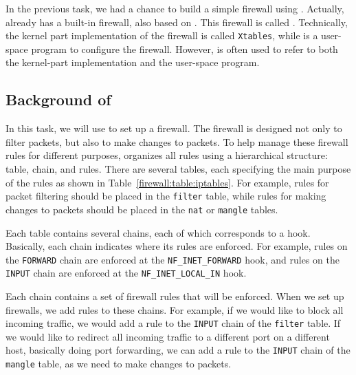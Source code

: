 In the previous task, we had a chance to build a simple firewall using \netfilter. Actually,
\linux already has a built-in firewall, also based on \netfilter. This firewall is called
\iptables. Technically, the kernel part implementation of the firewall
is called \texttt{Xtables}, while \iptables is a user-space program to
configure the firewall. However, \iptables is often used to refer to both the kernel-part
implementation and the user-space program. 



\subsection{Background of \iptables}

In this task, we will use \iptables to set up a firewall. 
The \iptables firewall is designed not only to filter packets, but also to make changes to
packets. To help manage these firewall rules for different purposes, \iptables organizes all
rules using a hierarchical structure: table, chain, and rules.
There are several tables, each specifying the main purpose of the rules as shown
in Table~\ref{firewall:table:iptables}.
For example, rules for packet filtering should be
placed in the \texttt{filter} table, while rules for making changes to packets should be placed
in the \texttt{nat} or \texttt{mangle} tables.

Each table contains several chains, each of which corresponds to a \netfilter hook. Basically,
each chain indicates where its rules are enforced. For example, rules on
the \texttt{FORWARD} chain are enforced at the \texttt{NF\_INET\_FORWARD} hook, and rules on
the \texttt{INPUT} chain are enforced at the  \texttt{NF\_INET\_LOCAL\_IN} hook.

Each chain contains a set of firewall rules that will be enforced.
When we set up firewalls, we add rules to these chains.
For example, if we would like to block all incoming \telnet traffic, we would
add a rule to the \texttt{INPUT} chain of the \texttt{filter} table.  If we
would like to redirect all incoming \telnet traffic to a different
port on a different host, basically doing port forwarding, we can add a rule to the
\texttt{INPUT} chain of the \texttt{mangle} table, as we need to make changes to packets.



